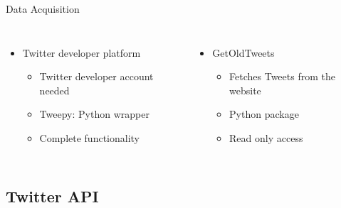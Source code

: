 \documentclass{beamer}
\begin{document}
\begin{frame}{Data Acquisition}
\begin{columns}
\begin{itemize}
\item Twitter developer platform
	\begin{itemize}
	\item Twitter developer account needed
	\item Tweepy: Python wrapper
	\item Complete functionality
	\end{itemize}
\end{itemize}
\vspace{0.5cm}
\pause
{}
\begin{itemize}
\item GetOldTweets
	\begin{itemize}
	\item Fetches Tweets from the website
	\item Python package
	\item Read only access
	\end{itemize}
\end{itemize}
\vspace{0.5cm}
\end{columns}
\end{frame}

\subsection{Twitter API}
\end{document}
